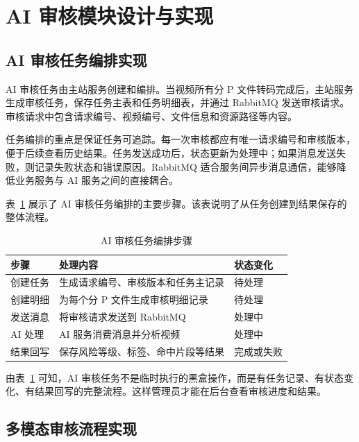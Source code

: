 \section{AI 审核模块设计与实现}
\label{sec:ai-audit-implementation}

\subsection{AI 审核任务编排实现}
\label{subsec:ai-task-orchestration}

AI 审核任务由主站服务创建和编排。当视频所有分 P 文件转码完成后，主站服务生成审核任务，保存任务主表和任务明细表，并通过 RabbitMQ 发送审核请求。审核请求中包含请求编号、视频编号、文件信息和资源路径等内容。

任务编排的重点是保证任务可追踪。每一次审核都应有唯一请求编号和审核版本，便于后续查看历史结果。任务发送成功后，状态更新为处理中；如果消息发送失败，则记录失败状态和错误原因。RabbitMQ 适合服务间异步消息通信，能够降低业务服务与 AI 服务之间的直接耦合\cite{rabbitmqdocs}。

表~\ref{tab:ai-task-orchestration} 展示了 AI 审核任务编排的主要步骤。该表说明了从任务创建到结果保存的整体流程。

\begin{table}[htbp]
  \centering
  \caption{AI 审核任务编排步骤}
  \label{tab:ai-task-orchestration}
  \begin{tabular}{p{}p{}p{}}
    \hline
    \textbf{步骤} & \textbf{处理内容} & \textbf{状态变化} \\
    \hline
    创建任务 & 生成请求编号、审核版本和任务主记录 & 待处理 \\
    创建明细 & 为每个分 P 文件生成审核明细记录 & 待处理 \\
    发送消息 & 将审核请求发送到 RabbitMQ & 处理中 \\
    AI 处理 & AI 服务消费消息并分析视频 & 处理中 \\
    结果回写 & 保存风险等级、标签、命中片段等结果 & 完成或失败 \\
    \hline
  \end{tabular}
\end{table}

由表~\ref{tab:ai-task-orchestration} 可知，AI 审核任务不是临时执行的黑盒操作，而是有任务记录、有状态变化、有结果回写的完整流程。这样管理员才能在后台查看审核进度和结果。

\subsection{多模态审核流程实现}
\label{subsec:multimodal-audit-implementation}

